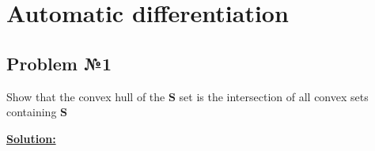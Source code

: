  \section{Automatic differentiation}

\subsection{Problem №1}

Show that the convex hull of the $\mathbf{S}$ set is the intersection of all convex sets containing $\mathbf{S}$

\underline{\textbf{Solution:}}
